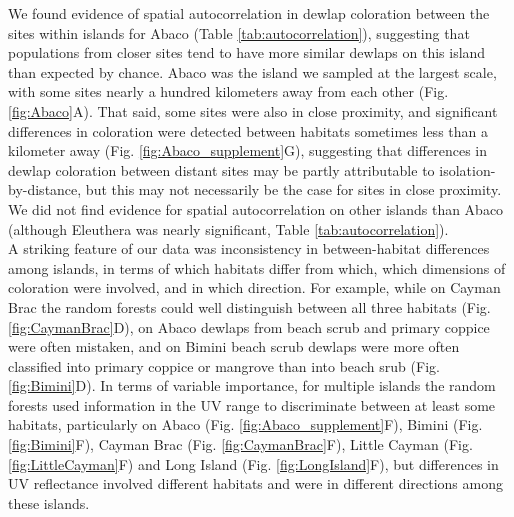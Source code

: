 We found evidence of spatial autocorrelation in dewlap coloration between the sites within islands for Abaco (Table \ref{tab:autocorrelation}), suggesting that populations from closer sites tend to have more similar dewlaps on this island than expected by chance. Abaco was the island we sampled at the largest scale, with some sites nearly a hundred kilometers away from each other (Fig. \ref{fig:Abaco}A). That said, some sites were also in close proximity, and significant differences in coloration were detected between habitats sometimes less than a kilometer away (Fig. \ref{fig:Abaco_supplement}G), suggesting that differences in dewlap coloration between distant sites may be partly attributable to isolation-by-distance, but this may not necessarily be the case for sites in close proximity. We did not find evidence for spatial autocorrelation on other islands than Abaco (although Eleuthera was nearly significant, Table \ref{tab:autocorrelation}).\\

A striking feature of our data was inconsistency in between-habitat differences among islands, in terms of which habitats differ from which, which dimensions of coloration were involved, and in which direction. For example, while on Cayman Brac the random forests could well distinguish between all three habitats (Fig. \ref{fig:CaymanBrac}D), on Abaco dewlaps from beach scrub and primary coppice were often mistaken, and on Bimini beach scrub dewlaps were more often classified into primary coppice or mangrove than into beach srub (Fig. \ref{fig:Bimini}D). In terms of variable importance, for multiple islands the random forests used information in the UV range to discriminate between at least some habitats, particularly on Abaco (Fig. \ref{fig:Abaco_supplement}F), Bimini (Fig. \ref{fig:Bimini}F), Cayman Brac (Fig. \ref{fig:CaymanBrac}F), Little Cayman (Fig. \ref{fig:LittleCayman}F) and Long Island (Fig. \ref{fig:LongIsland}F), but differences in UV reflectance involved different habitats and were in different directions among these islands.\\